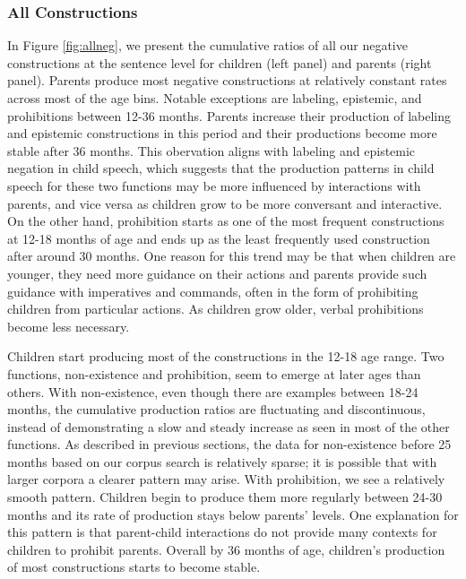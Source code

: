 \documentclass[
  man,floatsintext]{apa6}
\begin{document}
\hypertarget{all-constructions}{%
\subsubsection{All Constructions}\label{all-constructions}}

In Figure \ref{fig:allneg}, we present the cumulative ratios of all our negative constructions at the sentence level for children (left panel) and parents (right panel). Parents produce most negative constructions at relatively constant rates across most of the age bins. Notable exceptions are labeling, epistemic, and prohibitions between 12-36 months. Parents increase their production of labeling and epistemic constructions in this period and their productions become more stable after 36 months. This obervation aligns with labeling and epistemic negation in child speech, which suggests that the production patterns in child speech for these two functions may be more influenced by interactions with parents, and vice versa as children grow to be more conversant and interactive. On the other hand, prohibition starts as one of the most frequent constructions at 12-18 months of age and ends up as the least frequently used construction after around 30 months. One reason for this trend may be that when children are younger, they need more guidance on their actions and parents provide such guidance with imperatives and commands, often in the form of prohibiting children from particular actions. As children grow older, verbal prohibitions become less necessary.

Children start producing most of the constructions in the 12-18 age range. Two functions, non-existence and prohibition, seem to emerge at later ages than others. With non-existence, even though there are examples between 18-24 months, the cumulative production ratios are fluctuating and discontinuous, instead of demonstrating a slow and steady increase as seen in most of the other functions. As described in previous sections, the data for non-existence before 25 months based on our corpus search is relatively sparse; it is possible that with larger corpora a clearer pattern may arise. With prohibition, we see a relatively smooth pattern. Children begin to produce them more regularly between 24-30 months and its rate of production stays below parents' levels. One explanation for this pattern is that parent-child interactions do not provide many contexts for children to prohibit parents. Overall by 36 months of age, children's production of most constructions starts to become stable.
\end{document}
